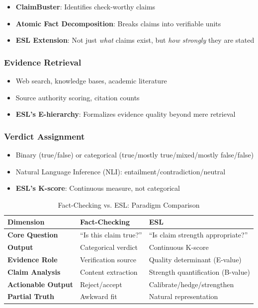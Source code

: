 \documentclass[11pt,a4paper]{article}
\begin{document}
\begin{itemize}
    \item \textbf{ClaimBuster}: Identifies check-worthy claims
    \item \textbf{Atomic Fact Decomposition}: Breaks claims into verifiable units
    \item \textbf{ESL Extension}: Not just \textit{what} claims exist, but \textit{how strongly} they are stated
\end{itemize}

\subsubsection{Evidence Retrieval}

\begin{itemize}
    \item Web search, knowledge bases, academic literature
    \item Source authority scoring, citation counts
    \item \textbf{ESL's E-hierarchy}: Formalizes evidence quality beyond mere retrieval
\end{itemize}

\subsubsection{Verdict Assignment}

\begin{itemize}
    \item Binary (true/false) or categorical (true/mostly true/mixed/mostly false/false)
    \item Natural Language Inference (NLI): entailment/contradiction/neutral
    \item \textbf{ESL's K-score}: Continuous measure, not categorical
\end{itemize}

\begin{table}[h]
\centering
\caption{Fact-Checking vs. ESL: Paradigm Comparison}
\label{tab:factcheck-esl}
\begin{tabular}{p{4cm}p{5cm}p{5cm}}
\toprule
\textbf{Dimension} & \textbf{Fact-Checking} & \textbf{ESL} \\
\midrule
\textbf{Core Question} & ``Is this claim true?'' & ``Is claim strength appropriate?'' \\
\textbf{Output} & Categorical verdict & Continuous K-score \\
\textbf{Evidence Role} & Verification source & Quality determinant (E-value) \\
\textbf{Claim Analysis} & Content extraction & Strength quantification (B-value) \\
\textbf{Actionable Output} & Reject/accept & Calibrate/hedge/strengthen \\
\textbf{Partial Truth} & Awkward fit & Natural representation \\
\bottomrule
\end{tabular}
\end{table}
\end{document}
